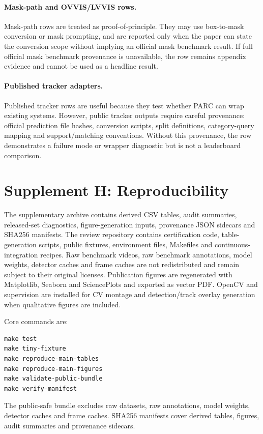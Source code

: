 \documentclass[11pt]{article}
\begin{document}
\paragraph{Mask-path and OVVIS/LVVIS rows.}
Mask-path rows are treated as proof-of-principle.
They may use box-to-mask conversion or mask prompting, and are reported only when the paper can state the conversion scope without implying an official mask benchmark result.
If full official mask benchmark provenance is unavailable, the row remains appendix evidence and cannot be used as a headline result.

\paragraph{Published tracker adapters.}
Published tracker rows are useful because they test whether PARC can wrap existing systems.
However, public tracker outputs require careful provenance: official prediction file hashes, conversion scripts, split definitions, category-query mapping and support/matching conventions.
Without this provenance, the row demonstrates a failure mode or wrapper diagnostic but is not a leaderboard comparison.

\clearpage

\section*{Supplement H: Reproducibility}

The supplementary archive contains derived CSV tables, audit summaries, released-set diagnostics, figure-generation inputs, provenance JSON sidecars and SHA256 manifests.
The review repository contains certification code, table-generation scripts, public fixtures, environment files, Makefiles and continuous-integration recipes.
Raw benchmark videos, raw benchmark annotations, model weights, detector caches and frame caches are not redistributed and remain subject to their original licenses.
Publication figures are regenerated with Matplotlib, Seaborn and SciencePlots and exported as vector PDF.
OpenCV and supervision are installed for CV montage and detection/track overlay generation when qualitative figures are included.

Core commands are:
\begin{verbatim}
make test
make tiny-fixture
make reproduce-main-tables
make reproduce-main-figures
make validate-public-bundle
make verify-manifest
\end{verbatim}
The public-safe bundle excludes raw datasets, raw annotations, model weights, detector caches and frame caches.
SHA256 manifests cover derived tables, figures, audit summaries and provenance sidecars.
\end{document}
